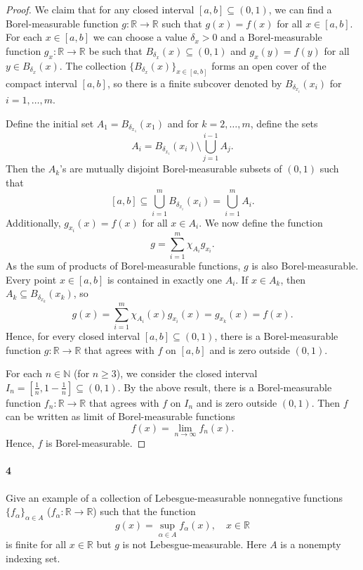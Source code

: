 \documentclass[12pt]{article}
\newlength{\myparskip}
\newenvironment{fullbox}{\begin{lrbox}{\savefullbox}\begin{minipage}{\dimexpr\textwidth-2\fboxsep\relax}\setlength{\parskip}{\myparskip}}{\end{minipage}\end{lrbox}\framebox[\textwidth]{\usebox{\savefullbox}}}
\newenvironment{pbox}[1][]{\begin{fullbox}\ifx#1\empty\else\paragraph{#1}\fi}{\end{fullbox}}
\newcommand{\N}{\mathbb{N}}
\newcommand{\R}{\mathbb{R}}
\newcommand{\<}{\langle}
\renewcommand{\>}{\rangle}
\begin{document}
\begin{proof}
    We claim that for any closed interval $[a, b] \subseteq (0, 1)$, we can find a Borel-measurable function $g : \R \to \R$ such that $g(x) = f(x)$ for all $x \in [a, b]$.
    For each $x \in [a, b]$ we can choose a value $\delta_x > 0$ and a Borel-measurable function $g_x : \R \to \R$ be  such that $B_{\delta_x}(x) \subseteq (0, 1)$ and $g_x(y) = f(y)$ for all $y \in B_{\delta_x}(x)$.
    The collection $\{B_{\delta_x}(x)\}_{x \in [a, b]}$ forms an open cover of the compact interval $[a, b]$, so there is a finite subcover denoted by $B_{\delta_{x_i}}(x_i)$ for $i = 1, \dots, m$.

    Define the initial set $A_1 = B_{\delta_{x_1}}(x_1)$ and for $k = 2, \dots, m$, define the sets
    \[
        A_i = B_{\delta_{x_i}}(x_i) \setminus \bigcup_{j=1}^{i-1} A_j.
    \]
    Then the $A_k$'s are mutually disjoint Borel-measurable subsets of $(0, 1)$ such that
    \[
        [a, b]
            \subseteq \bigcup_{i=1}^{m} B_{\delta_{x_i}}(x_i) 
            = \bigcup_{i=1}^{m} A_i.
    \]
    Additionally, $g_{x_i}(x) = f(x)$ for all $x \in A_i$.
    We now define the function
    \[
        g = \sum_{i=1}^{m} \chi_{A_i}g_{x_i}.
    \]
    As the sum of products of Borel-measurable functions, $g$ is also Borel-measurable.
    Every point $x \in [a, b]$ is contained in exactly one $A_i$. If $x \in A_k$, then $A_k \subseteq B_{\delta_{x_k}}(x_k)$, so
    \[
        g(x)
            = \sum_{i=1}^{m} \chi_{A_i}(x)g_{x_i}(x)
            = g_{x_k}(x)
            = f(x).
    \]
    Hence, for every closed interval $[a, b] \subseteq (0, 1)$, there is a Borel-measurable function $g : \R \to \R$ that agrees with $f$ on $[a, b]$ and is zero outside $(0, 1)$.

    For each $n \in \N$ (for $n \geq 3$), we consider the closed interval $I_n = [\tfrac{1}{n}, 1 - \tfrac{1}{n}] \subseteq (0, 1)$. 
    By the above result, there is a Borel-measurable function $f_n : \R \to \R$ that agrees with $f$ on $I_n$ and is zero outside $(0, 1)$. 
    Then $f$ can be written as limit of Borel-measurable functions
    \[
        f(x) = \lim_{n \to \infty} f_n(x).
    \]
    Hence, $f$ is Borel-measurable.
\end{proof}

\newpage
\begin{pbox}[4]
    Give an example of a collection of Lebesgue-measurable nonnegative functions $\{f_\alpha\}_{\alpha \in A}$ ($f_\alpha : \R \to \R$) such that the function
    \[
        g(x) = \sup_{\alpha \in A} f_\alpha(x), \quad x \in \R
    \]
    is finite for all $x \in \R$ but $g$ is not Lebesgue-measurable. Here $A$ is a nonempty indexing set.
\end{pbox}
\end{document}
